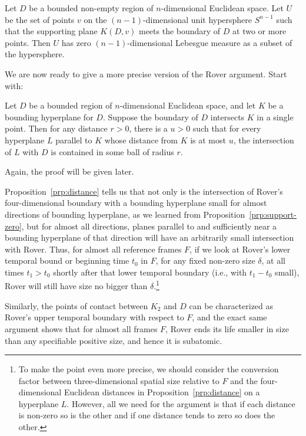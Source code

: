 \begin{prp}\label{prp:support-zero}
Let $D$ be a bounded non-empty region of $n$-dimensional Euclidean space. Let $U$ be the set of points $v$ on the 
$(n-1)$-dimensional unit hypersphere $S^{n-1}$ such that the supporting plane $K(D,v)$ meets the boundary of $D$ at two or more points. Then $U$ has zero $(n-1)$-dimensional Lebesgue measure as a subset of the hypersphere.
\end{prp}

We are now ready to give a more precise version of the Rover argument. Start with:

\begin{prp}\label{prp:distance} Let $D$ be a bounded region of $n$-dimensional Euclidean space, and let $K$ be a bounding hyperplane for $D$. Suppose the boundary of $D$ intersects $K$ in a single point. Then for any distance $r>0$, there is a $u>0$ such that for every hyperplane $L$ parallel to $K$ whose distance from $K$ is at most $u$, the intersection of $L$ with $D$ is contained in some ball of radius $r$.
\end{prp}

Again, the proof will be given later.

Proposition~\ref{prp:distance} tells us that not only is the intersection of Rover's four-dimensional
boundary with a bounding hyperplane small for almost directions of bounding hyperplane, as we learned from 
Proposition~\ref{prp:support-zero}, but for almost all directions, planes parallel to and sufficiently near
a bounding hyperplane of that direction will have an arbitrarily small intersection with Rover. Thus, for almost
all reference frames $F$, if we look at Rover's lower temporal bound or beginning time $t_0$ in $F$, for any fixed
non-zero size $\delta$, at all times $t_1>t_0$ shortly after that lower temporal boundary (i.e., with $t_1-t_0$ 
small), Rover will still have size no bigger than $\delta$.\footnote{To make the point even more precise, we should
consider the conversion factor between three-dimensional spatial size relative to $F$ and the four-dimensional Euclidean distances in Proposition~\ref{prp:distance} on a hyperplane $L$. However, all we need for the argument is that if 
each distance is non-zero so is the other and if one distance tends to zero so does the other.}

Similarly, the points of contact between $K_2$ and $D$ can be characterized as Rover's upper temporal boundary with respect to $F$, and the exact same argument shows that for almost all frames $F$, Rover ends its life smaller in size than any specifiable positive size, and hence it is subatomic.

